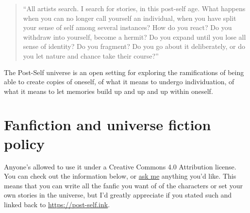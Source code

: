 \begin{quote}
``All artists search. I search for stories, in this post-self age. What happens when you can no longer call yourself an individual, when you have split your sense of self among several instances? How do you react? Do you withdraw into yourself, become a hermit? Do you expand until you lose all sense of identity? Do you fragment? Do you go about it deliberately, or do you let nature and chance take their course?''
\end{quote}

The Post-Self universe is an open setting for exploring the ramifications of being able to create copies of oneself, of what it means to undergo individuation, of what it means to let memories build up and up and up within oneself.

\section{Fanfiction and universe fiction policy}

Anyone's allowed to use it under a Creative Commons 4.0 Attribution license. You can check out the information below, or \href{https://makyo.is}{ask me} anything you'd like. This means that you can write all the fanfic you want of of the characters or set your own stories in the universe, but I'd greatly appreciate if you stated such and linked back to \url{https://post-self.ink}.
